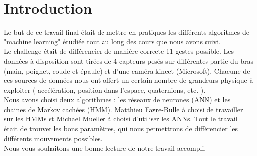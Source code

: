
\chapter{Introduction} %

\label{Chapitre 1} %


Le but de ce travail final était de mettre en pratiques les différents algoritmes de "machine learning" étudiée tout au long des cours que nous avons suivi.\\

Le challenge était de différencier de manière correcte 11 gestes possible. Les données à disposition sont tirées de 4 capteurs posés sur différentes partie du bras (main, poignet, coude et épaule) et d'une caméra kinect (Microsoft). Chacune de ces sources de données nous ont offert un certain nombre de grandeurs physique à exploiter ( accélération, position dans l'espace, quaternions, etc. ).\\

Nous avons choisi deux algorithmes : les réseaux de neurones (ANN) et les chaines de Markov cachées (HMM). Matthieu Favre-Bulle à choisi de travailler sur les HMMs et Michael Mueller à choisi d'utiliser les ANNs. Tout le travail était de trouver les bons paramètres, qui nous permettrons de différencier les différents mouvements possibles.\\

Nous vous souhaitons une bonne lecture de notre travail accompli.
























